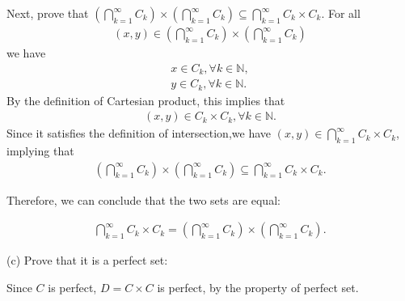 \documentclass[UTF8,a4paper,10pt]{article}
\begin{document}
\begin{solution}
    Next, prove that \(\left(\bigcap_{k=1}^{\infty} C_k\right) \times \left(\bigcap_{k=1}^{\infty} C_k\right) \subseteq \bigcap_{k=1}^{\infty} C_k \times C_k\). For all
    \begin{equation*}
      \begin{aligned}
          (x,y)\in \left(\bigcap_{k=1}^{\infty} C_k\right) \times \left(\bigcap_{k=1}^{\infty} C_k\right)
      \end{aligned}
    \end{equation*}
    we have
    \begin{equation*}
      \begin{aligned}
        x\in C_k, \forall k \in \mathbb{N},\\
        y\in C_k, \forall k \in \mathbb{N}.
      \end{aligned}
    \end{equation*}
    By the definition of Cartesian product, this implies that
    \begin{equation*}
      \begin{aligned}
        (x,y)\in C_k \times C_k, \forall k \in \mathbb{N}.
      \end{aligned}
    \end{equation*}
    Since it satisfies the definition of intersection,we have \((x,y)\in \bigcap_{k=1}^{\infty} C_k \times C_k \), implying that 
    \begin{equation*}
      \begin{aligned}
        \left(\bigcap_{k=1}^{\infty} C_k\right) \times \left(\bigcap_{k=1}^{\infty} C_k\right) \subseteq \bigcap_{k=1}^{\infty} C_k \times C_k .
      \end{aligned}
    \end{equation*}
    


    Therefore, we can conclude that the two sets are equal:

    \begin{equation*}
      \begin{aligned}
        \bigcap_{k=1}^{\infty} C_k \times C_k =  \left(\bigcap_{k=1}^{\infty} C_k\right) \times \left(\bigcap_{k=1}^{\infty} C_k\right) .
      \end{aligned}
    \end{equation*}

    (c) Prove that it is a perfect set:
    
    Since \(C\) is perfect, \(D=C\times C\) is perfect, by the property of perfect set.


\end{solution}
\end{document}
